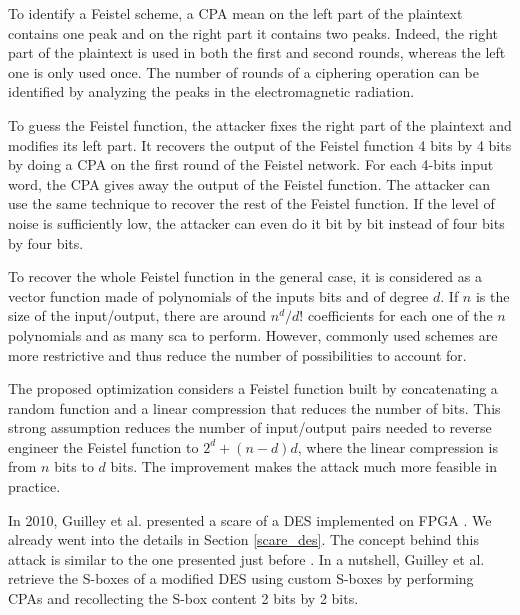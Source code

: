 \documentclass[11pt]{sdm}
\begin{document}
To identify a Feistel scheme, a CPA mean on the left part of the plaintext contains one peak and on the right part it contains two peaks.
Indeed, the right part of the plaintext is used in both the first and second rounds, whereas the left one is only used once.
The number of rounds of a ciphering operation can be identified by analyzing the peaks in the electromagnetic radiation.

To guess the Feistel function, the attacker fixes the right part of the plaintext and modifies its left part.
It recovers the output of the Feistel function 4 bits by 4 bits by doing a CPA on the first round of the Feistel network.
For each 4-bits input word, the CPA gives away the output of the Feistel function.
The attacker can use the same technique to recover the rest of the Feistel function.
If the level of noise is sufficiently low, the attacker can even do it bit by bit instead of four bits by four bits.

To recover the whole Feistel function in the general case, it is considered as a vector function made of polynomials of the inputs bits and of degree $d$.
If $n$ is the size of the input/output, there are around $n^d/d!$ coefficients for each one of the $n$ polynomials and as many \gls{sca} to perform.
However, commonly used schemes are more restrictive and thus reduce the number of possibilities to account for.

The proposed optimization considers a Feistel function built by concatenating a random function and a linear compression that reduces the number of bits.
This strong assumption reduces the number of input/output pairs needed to reverse engineer the Feistel function to $2^d + (n-d)d$, where the linear compression is from $n$ bits to $d$ bits.
The improvement makes the attack much more feasible in practice. 


In 2010, Guilley et al. presented a \gls{scare} of a DES implemented on FPGA \parencite{Guilley_Sauvage_Micolod_Réal_Valette_2010}.
We already went into the details in Section \ref{scare_des}.
The concept behind this attack is similar to the one presented just before \parencite{Réal_Dubois_Guilloux_Valette_Drissi_2008}.
In a nutshell, Guilley et al. retrieve the S-boxes of a modified DES using custom S-boxes by performing CPAs and recollecting the S-box content 2 bits by 2 bits.


\end{document}
